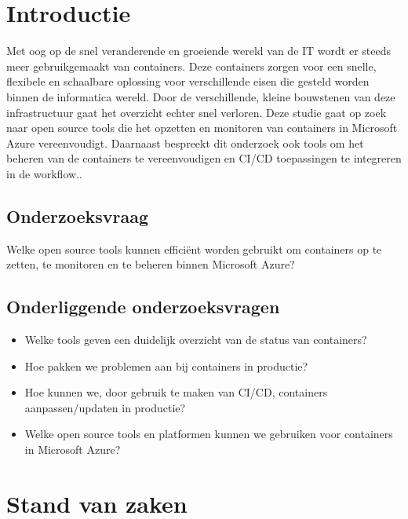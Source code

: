 
\section{Introductie} %
\label{sec:introductie}
Met oog op de snel veranderende en groeiende wereld van de IT wordt er steeds meer gebruikgemaakt van containers. Deze containers zorgen voor een snelle, flexibele en schaalbare oplossing voor verschillende  eisen die gesteld worden binnen de informatica wereld. Door de verschillende, kleine bouwstenen van deze infrastructuur gaat het overzicht echter snel verloren. Deze studie gaat op zoek naar open source tools die het opzetten en monitoren van containers in Microsoft Azure vereenvoudigt. Daarnaast bespreekt dit onderzoek ook tools om het beheren van de containers te vereenvoudigen en CI/CD toepassingen te integreren in de workflow..
\subsection{Onderzoeksvraag}
Welke open source tools kunnen efficiënt worden gebruikt om containers op te zetten, te monitoren en te beheren binnen Microsoft Azure?
\subsection{Onderliggende onderzoeksvragen}
\begin{itemize}
    \item Welke tools geven een duidelijk overzicht van de status van containers?
    \item Hoe pakken we problemen aan bij containers in productie?
    \item Hoe kunnen we, door gebruik te maken van CI/CD, containers aanpassen/updaten in productie?
    \item Welke open source tools en platformen kunnen we gebruiken voor containers in Microsoft Azure?
\end{itemize}

\section{Stand van zaken}
\label{sec:state-of-the-art}

